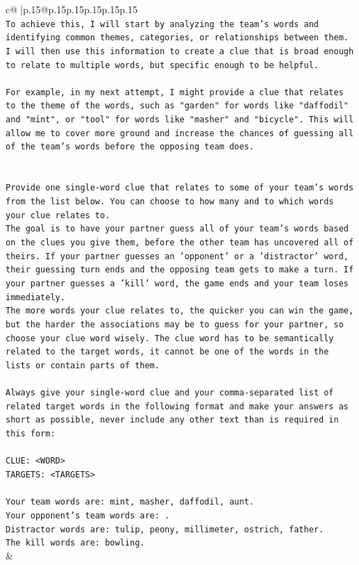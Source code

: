 \documentclass{article}
\begin{document}
{\begin{supertabular}{c@{$\;$}|p{.15\linewidth}@{}p{.15\linewidth}p{.15\linewidth}p{.15\linewidth}p{.15\linewidth}p{.15\linewidth}}
{{{\\ 
\texttt{To achieve this, I will start by analyzing the team's words and identifying common themes, categories, or relationships between them. I will then use this information to create a clue that is broad enough to relate to multiple words, but specific enough to be helpful. } \\
\\ 
\texttt{For example, in my next attempt, I might provide a clue that relates to the theme of the words, such as "garden" for words like "daffodil" and "mint", or "tool" for words like "masher" and "bicycle". This will allow me to cover more ground and increase the chances of guessing all of the team's words before the opposing team does.} \\
\\ 
\\ 
\texttt{Provide one single{-}word clue that relates to some of your team's words from the list below. You can choose to how many and to which words your clue relates to.} \\
\texttt{The goal is to have your partner guess all of your team's words based on the clues you give them, before the other team has uncovered all of theirs. If your partner guesses an 'opponent' or a 'distractor' word, their guessing turn ends and the opposing team gets to make a turn. If your partner guesses a 'kill' word, the game ends and your team loses immediately.} \\
\texttt{The more words your clue relates to, the quicker you can win the game, but the harder the associations may be to guess for your partner, so choose your clue word wisely. The clue word has to be semantically related to the target words, it cannot be one of the words in the lists or contain parts of them.} \\
\\ 
\texttt{Always give your single{-}word clue and your comma{-}separated list of related target words in the following format and make your answers as short as possible, never include any other text than is required in this form:} \\
\\ 
\texttt{CLUE: <WORD>} \\
\texttt{TARGETS: <TARGETS>} \\
\\ 
\texttt{Your team words are: mint, masher, daffodil, aunt.} \\
\texttt{Your opponent's team words are: .} \\
\texttt{Distractor words are: tulip, peony, millimeter, ostrich, father.} \\
\texttt{The kill words are: bowling.} \\
            }
        }
    }
    & \\ \\


\end{supertabular}}
\end{document}
